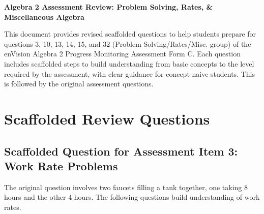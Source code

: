 \documentclass[12pt]{article}
\begin{document}
\begin{center}
    \textbf{Algebra 2 Assessment Review: Problem Solving, Rates, \& Miscellaneous Algebra}
\end{center}

This document provides revised scaffolded questions to help students prepare for questions 3, 10, 13, 14, 15, and 32 (Problem Solving/Rates/Misc. group) of the enVision Algebra 2 Progress Monitoring Assessment Form C. Each question includes scaffolded steps to build understanding from basic concepts to the level required by the assessment, with clear guidance for concept-naive students. This is followed by the original assessment questions.

\section*{Scaffolded Review Questions}

\subsection*{Scaffolded Question for Assessment Item 3: Work Rate Problems}
The original question involves two faucets filling a tank together, one taking 8 hours and the other 4 hours. The following questions build understanding of work rates.
\end{document}

